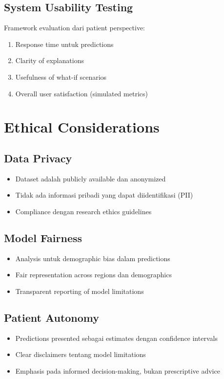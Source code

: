 \subsection{System Usability Testing}
Framework evaluation dari patient perspective:
\begin{enumerate}
    \item Response time untuk predictions
    \item Clarity of explanations
    \item Usefulness of what-if scenarios
    \item Overall user satisfaction (simulated metrics)
\end{enumerate}

\section{Ethical Considerations}

\subsection{Data Privacy}
\begin{itemize}
    \item Dataset adalah publicly available dan anonymized
    \item Tidak ada informasi pribadi yang dapat diidentifikasi (PII)
    \item Compliance dengan research ethics guidelines
\end{itemize}

\subsection{Model Fairness}
\begin{itemize}
    \item Analysis untuk demographic bias dalam predictions
    \item Fair representation across regions dan demographics
    \item Transparent reporting of model limitations
\end{itemize}

\subsection{Patient Autonomy}
\begin{itemize}
    \item Predictions presented sebagai estimates dengan confidence intervals
    \item Clear disclaimers tentang model limitations
    \item Emphasis pada informed decision-making, bukan prescriptive advice
\end{itemize}